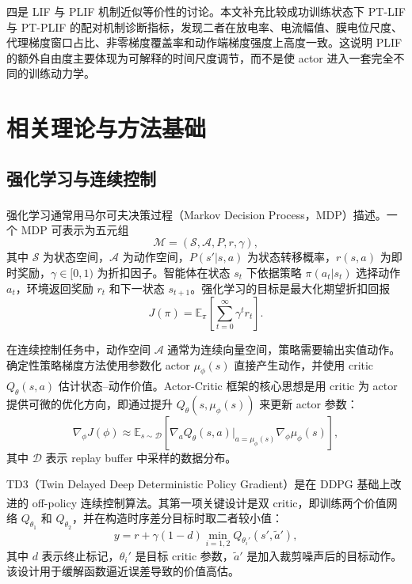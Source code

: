 \documentclass[UTF8,zihao=-4,oneside,openany]{ctexbook}
\let\oldcite\cite
\renewcommand{\cite}[1]{\textsuperscript{\oldcite{#1}}}
\begin{document}
四是 LIF 与 PLIF 机制近似等价性的讨论。本文补充比较成功训练状态下 PT-LIF 与 PT-PLIF 的配对机制诊断指标，发现二者在放电率、电流幅值、膜电位尺度、代理梯度窗口占比、非零梯度覆盖率和动作端梯度强度上高度一致。这说明 PLIF 的额外自由度主要体现为可解释的时间尺度调节，而不是使 actor 进入一套完全不同的训练动力学。

\chapter{相关理论与方法基础}

\section{强化学习与连续控制}
强化学习通常用马尔可夫决策过程（Markov Decision Process，MDP）描述\cite{sutton2018rl}。一个 MDP 可表示为五元组
\begin{equation}
\mathcal{M}=(\mathcal{S},\mathcal{A},P,r,\gamma),
\end{equation}
其中 $\mathcal{S}$ 为状态空间，$\mathcal{A}$ 为动作空间，$P(s'|s,a)$ 为状态转移概率，$r(s,a)$ 为即时奖励，$\gamma\in[0,1)$ 为折扣因子。智能体在状态 $s_t$ 下依据策略 $\pi(a_t|s_t)$ 选择动作 $a_t$，环境返回奖励 $r_t$ 和下一状态 $s_{t+1}$。强化学习的目标是最大化期望折扣回报
\begin{equation}
J(\pi)=\mathbb{E}_{\pi}\left[\sum_{t=0}^{\infty}\gamma^t r_t\right].
\end{equation}

在连续控制任务中，动作空间 $\mathcal{A}$ 通常为连续向量空间，策略需要输出实值动作。确定性策略梯度方法使用参数化 actor $\mu_{\phi}(s)$ 直接产生动作，并使用 critic $Q_{\theta}(s,a)$ 估计状态--动作价值\cite{silver2014dpg,lillicrap2016ddpg}。Actor-Critic 框架的核心思想是用 critic 为 actor 提供可微的优化方向，即通过提升 $Q_{\theta}(s,\mu_{\phi}(s))$ 来更新 actor 参数：
\begin{equation}
\nabla_{\phi}J(\phi)\approx
\mathbb{E}_{s\sim\mathcal{D}}\left[
\nabla_a Q_{\theta}(s,a)\big|_{a=\mu_{\phi}(s)}
\nabla_{\phi}\mu_{\phi}(s)
\right],
\end{equation}
其中 $\mathcal{D}$ 表示 replay buffer 中采样的数据分布。

TD3（Twin Delayed Deep Deterministic Policy Gradient）是在 DDPG 基础上改进的 off-policy 连续控制算法\cite{lillicrap2016ddpg,fujimoto2018td3}。其第一项关键设计是双 critic，即训练两个价值网络 $Q_{\theta_1}$ 和 $Q_{\theta_2}$，并在构造时序差分目标时取二者较小值：
\begin{equation}
y=r+\gamma(1-d)\min_{i=1,2}Q_{\theta_i'}(s',\tilde{a}'),
\end{equation}
其中 $d$ 表示终止标记，$\theta_i'$ 是目标 critic 参数，$\tilde{a}'$ 是加入裁剪噪声后的目标动作。该设计用于缓解函数逼近误差导致的价值高估。
\end{document}
